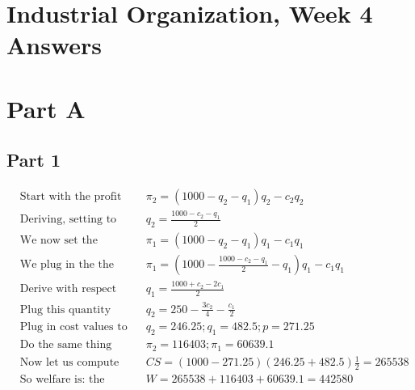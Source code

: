 \documentclass[12pt]{report}
\numberwithin{equation}{section}
\begin{document}
\section{Industrial Organization, Week 4 Answers}


\section{Part A}
\subsection{Part 1}
\begin{align*}
&\text{Start with the profit function of the second player} ~~ 
&& \pi_2=(1000-q_2-q_1)q_2 - c_2q_2
\\
&\text{Deriving, setting to zero, and re-arranging we get} ~~ 
&&  q_2 =  \frac{1000-c_2-q_1}{2}
\\
&\text{We now set the profit function of the first player} ~~ 
&&  \pi_1=(1000-q_2-q_1)q_1 - c_1q_1
\\
&\text{We plug in the the quantity of the second firm} ~~ 
&&  \pi_1=(1000-\frac{1000-c_2-q_1}{2}-q_1)q_1 - c_1q_1
\\
&\text{Derive with respect to quantity and solve} ~~ 
&&  q_1= \frac{1000+c_2-2c_1}{2}
\\
&\text{Plug this quantity into the second firms quantity} ~~ 
&&  q_2= 250-\frac{3 c_2}{4}-\frac{c_1}{2}
\\
&\text{Plug in cost values to get price and quantities} ~~ 
&&  q_2= 246.25; q_1= 482.5; p = 271.25
\\
&\text{Do the same thing with the profits:} ~~ 
&&  \pi_2= 116403; \pi_1= 60639.1
\\
&\text{Now let us compute the consumer surplus} ~~ 
&&  CS= (1000-271.25)(246.25+482.5)\frac{1}{2} = 265538
\\
&\text{So welfare is: the same thing with the profits:} ~~ 
&&  W = 265538 + 116403+60639.1=442580
\\
\end{align*}
\end{document}
